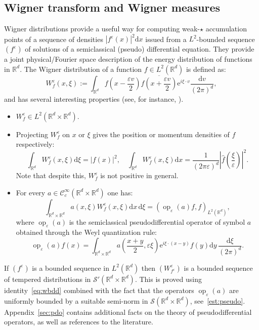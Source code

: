 \documentclass[10pt]{amsart}
\theoremstyle{definition}
\DeclareMathOperator{\op}{op}
\newcommand*\R{{\mathbb R}}
\newcommand*\eps{\varepsilon}
\numberwithin{equation}{section}
\newcommand{\ee}{{\mathrm e}}
\newcommand*{\dd}{\mathrm{d}}
\newcommand*{\dx}{\dd x}
\newcommand*{\dy}{\dd y}
\newcommand*{\dv}{\dd v}
\newcommand*{\dxi}{\dd \xi}
\begin{document}
\subsection{Wigner transform and Wigner measures} Wigner distributions provide a useful way for computing weak-$\star$ accumulation points of a sequence of densities $|f^\eps(x)|^2\dx$ issued from a $L^2$-bounded sequence~$(f^\eps)$ of solutions of a semiclassical (pseudo) differential equation. They provide a joint physical/Fourier space description of the energy distribution of functions in $\R^d$. The Wigner distribution of a function $f\in L^2(\R^d)$ is defined as:
\[
W^\eps_f(x,\xi):=\int_{\R^d}f\left(x-\frac{\eps v}{2}\right)\overline{f\left(x+\frac{\eps v}{2}\right)}{\ee}^{i\xi\cdot v}\frac{\dv}{(2\pi)^d},
\]
and has several interesting properties (see, for instance, \cite{FollandPhaseSpace}).
\begin{itemize}
\item $W^\eps_f\in L^2(\R^d\times\R^d)$.
\item Projecting $W_f^\eps$ on $x$ or $\xi$ gives the position or momentum densities of $f$ respectively:
\[
\int_{\R^d}W_f^\eps(x,\xi)\dxi=|f(x)|^2,\quad \int_{\R^d}W_f^\eps(x,\xi)\dx=\frac{1}{(2\pi\eps)^d}\left|\widehat{f}\left(\frac{\xi}{\eps}\right)\right|^2.
\]
Note that despite this, $W_f^\eps$ is not positive in general.
\item For every $a\in\mathcal{C}^\infty_c(\R^d\times\R^d)$ one has:
\begin{equation}\label{eq:wbdd}
\int_{\R^d\times\R^d}a(x,\xi)W_f^\eps(x,\xi)\dx\,\dxi=(\op_\eps(a)f,f)_{L^2(\R^d)},
\end{equation}
where $\op_\eps(a)$ is the semiclassical pseudodifferential operator of symbol $a$ obtained through the Weyl quantization rule:
\[
\op_\eps(a) f(x)=\int_{\R^{d}\times\R^d} a\left(\frac{x+y}{2},\eps\xi\right) {\ee}^{i \xi\cdot (x-y)} f(y)\dy\,\frac{\dxi}{(2\pi)^d}.
\]
\end{itemize}

If $(f^\eps)$ is a bounded sequence in $L^2(\R^d)$ then $(W^\eps_{f^\eps})$ is a bounded sequence of tempered distributions in $\mathcal{S}'(\R^d\times\R^d)$. This is proved using identity~\eqref{eq:wbdd} combined with the fact that the operators $\op_\eps(a)$ are uniformly bounded by a suitable semi-norm in $\mathcal{S}(\R^d\times\R^d)$, see~\eqref{est:pseudo}. Appendix~\ref{sec:pdo} contains additional facts on the theory of pseudodifferential operators, as well as references to the literature.
\end{document}
